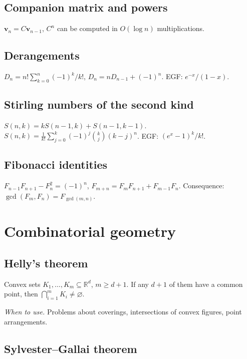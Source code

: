 \subsection{Companion matrix and powers}
\label{subsec:companion-matrix}

$\mathbf v_n=C\mathbf v_{n-1}$, $C^n$ can be computed in $O(\log n)$ multiplications.

\subsection{Derangements}
\label{subsec:derangements}

$D_n=n!\sum_{k=0}^n(-1)^k/k!$, $D_n=nD_{n-1}+(-1)^n$. EGF: $e^{-x}/(1-x)$.

\subsection{Stirling numbers of the second kind}
\label{subsec:stirling-2}

$S(n,k)=kS(n-1,k)+S(n-1,k-1)$. $S(n,k)=\frac1{k!}\sum_{j=0}^k(-1)^j\binom{k}{j}(k-j)^n$. EGF: $(e^x-1)^k/k!$.

\subsection{Fibonacci identities}
\label{subsec:fibonacci}

$F_{n-1}F_{n+1}-F_n^2=(-1)^n$, $F_{m+n}=F_mF_{n+1}+F_{m-1}F_n$. Consequence: $\gcd(F_m,F_n)=F_{\gcd(m,n)}$.

\medskip

\section{Combinatorial geometry}
\label{sec:combinatorial-geometry}

\subsection{Helly's theorem}
\label{subsec:helly}

Convex sets $K_1,\dots,K_m\subseteq\mathbb{R}^d$, $m\ge d+1$. If any $d+1$ of them have a common point, then $\bigcap_{i=1}^m K_i\neq\varnothing$.

\textit{When to use.} Problems about coverings, intersections of convex figures, point arrangements.

\subsection{Sylvester--Gallai theorem}
\label{subsec:sylvester-gallai}

